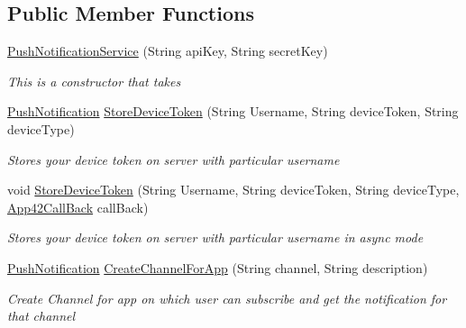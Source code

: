 \subsection*{Public Member Functions}
\begin{DoxyCompactItemize}
\item 
\hyperlink{classcom_1_1shephertz_1_1app42_1_1paas_1_1sdk_1_1csharp_1_1push_notification_1_1_push_notification_service_a06144dc28d512359fab311c55a99eca7}{Push\+Notification\+Service} (String api\+Key, String secret\+Key)
\begin{DoxyCompactList}\small\item\em This is a constructor that takes \end{DoxyCompactList}\item 
\hyperlink{classcom_1_1shephertz_1_1app42_1_1paas_1_1sdk_1_1csharp_1_1push_notification_1_1_push_notification}{Push\+Notification} \hyperlink{classcom_1_1shephertz_1_1app42_1_1paas_1_1sdk_1_1csharp_1_1push_notification_1_1_push_notification_service_a87e90c3aacce141546c64b2196bafdf3}{Store\+Device\+Token} (String Username, String device\+Token, String device\+Type)
\begin{DoxyCompactList}\small\item\em Stores your device token on server with particular username \end{DoxyCompactList}\item 
void \hyperlink{classcom_1_1shephertz_1_1app42_1_1paas_1_1sdk_1_1csharp_1_1push_notification_1_1_push_notification_service_a05fc8805d6444b133b2f438b0f2f148b}{Store\+Device\+Token} (String Username, String device\+Token, String device\+Type, \hyperlink{interfacecom_1_1shephertz_1_1app42_1_1paas_1_1sdk_1_1csharp_1_1_app42_call_back}{App42\+Call\+Back} call\+Back)
\begin{DoxyCompactList}\small\item\em Stores your device token on server with particular username in async mode \end{DoxyCompactList}\item 
\hyperlink{classcom_1_1shephertz_1_1app42_1_1paas_1_1sdk_1_1csharp_1_1push_notification_1_1_push_notification}{Push\+Notification} \hyperlink{classcom_1_1shephertz_1_1app42_1_1paas_1_1sdk_1_1csharp_1_1push_notification_1_1_push_notification_service_ac4c152f02c8cb52265bb0be96245b4d9}{Create\+Channel\+For\+App} (String channel, String description)
\begin{DoxyCompactList}\small\item\em Create Channel for app on which user can subscribe and get the notification for that channel \end{DoxyCompactList}\item 

\end{DoxyCompactItemize}
